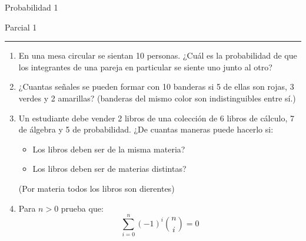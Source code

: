 \documentclass[12pt]{report}
\begin{document}
\pagestyle{empty}
\begin{center}
    \textsf{\Large Probabilidad 1}
    \par\medskip
    \textsf{\large Parcial 1}
\end{center}
\hrule
\par\bigskip

\begin{enumerate}
    \item En una mesa circular se sientan 10 personas. ¿Cuál es la probabilidad de que los integrantes de una pareja en particular se siente uno junto al otro?
    \item ¿Cuantas señales se pueden formar con 10 banderas si 5 de ellas son rojas, 3 verdes y 2 amarillas? (banderas del mismo color son indistinguibles entre sí.)
    \item Un estudiante debe vender 2 libros de una colección de 6 libros de cálculo, 7 de álgebra y 5 de probabilidad. ¿De cuantas maneras puede hacerlo si:
    \begin{itemize}
        \item Los libros deben ser de la misma materia?
        \item Los libros deben ser de materias distintas?
    \end{itemize}
    (Por materia todos los libros son dierentes)
    \item Para $n>0$ prueba que:
    $$
    \sum_{i=0}^n (-1)^i\binom{n}{i} = 0
    $$
    
\end{enumerate}
\end{document}
